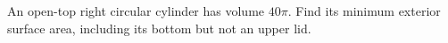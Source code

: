 An open-top right circular cylinder has volume $40\pi$. Find its minimum exterior surface area, including its bottom but not an upper lid.
